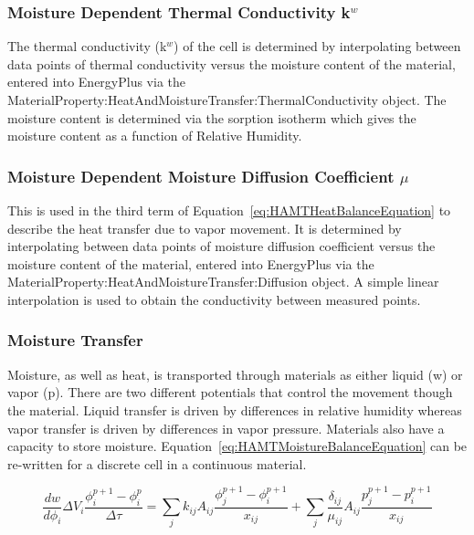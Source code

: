 \subsubsection{Moisture Dependent Thermal Conductivity k\(^{w}\)}\label{moisture-dependent-thermal-conductivity-kw}

The thermal conductivity (k\(^{w}\)) of the cell is determined by interpolating between data points of thermal conductivity versus the moisture content of the material, entered into EnergyPlus via the MaterialProperty:HeatAndMoistureTransfer:ThermalConductivity object. The moisture content is determined via the sorption isotherm which gives the moisture content as a function of Relative Humidity.

\subsubsection{Moisture Dependent Moisture Diffusion Coefficient \(\mu\)}\label{moisture-dependent-moisture-diffusion-coefficient-ux3bc}

This is used in the third term of Equation~\ref{eq:HAMTHeatBalanceEquation} to describe the heat transfer due to vapor movement. It is determined by interpolating between data points of moisture diffusion coefficient versus the moisture content of the material, entered into EnergyPlus via the MaterialProperty:HeatAndMoistureTransfer:Diffusion object. A simple linear interpolation is used to obtain the conductivity between measured points.

\subsubsection{Moisture Transfer}\label{moisture-transfer}

Moisture, as well as heat, is transported through materials as either liquid (w) or vapor (p). There are two different potentials that control the movement though the material. Liquid transfer is driven by differences in relative humidity whereas vapor transfer is driven by differences in vapor pressure. Materials also have a capacity to store moisture. Equation~\ref{eq:HAMTMoistureBalanceEquation} can be re-written for a discrete cell in a continuous material.

\begin{equation}
\frac{{dw}}{{d{\phi_i}}}\Delta {V_i}\frac{{\phi_i^{p + 1} - \phi_i^p}}{{\Delta \tau }} = \sum\limits_j {{k_{ij}}{A_{ij}}\frac{{\phi_j^{p + 1} - \phi_i^{p + 1}}}{{{x_{ij}}}}}  + \sum\limits_j {\frac{{{\delta_{ij}}}}{{{\mu_{ij}}}}{A_{ij}}\frac{{p_j^{p + 1} - p_i^{p + 1}}}{{{x_{ij}}}}}
\label{eq:HAMTMoistureBalanceEquationDiscreteCell}
\end{equation}

